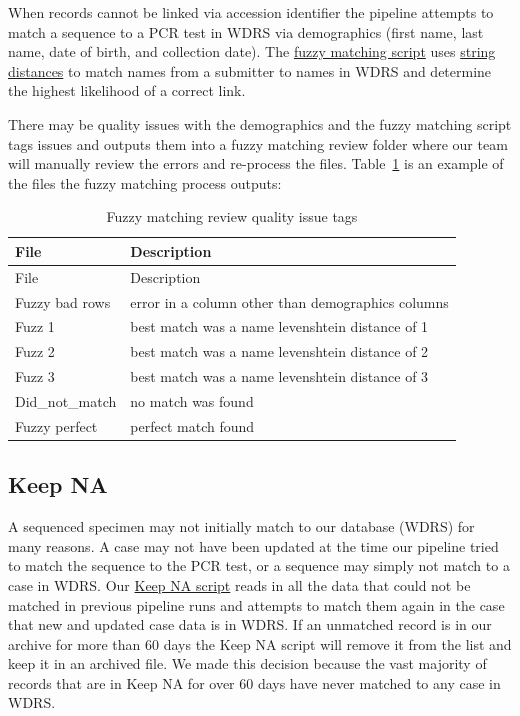 \documentclass[
  letterpaper,
  DIV=11,
  numbers=noendperiod]{scrartcl}
\begin{document}
When records cannot be linked via accession identifier the pipeline
attempts to match a sequence to a PCR test in WDRS via demographics
(first name, last name, date of birth, and collection date). The
\href{notebook/fuzzy.Rmd}{fuzzy matching script} uses
\href{https://github.com/markvanderloo/stringdist}{string distances} to
match names from a submitter to names in WDRS and determine the highest
likelihood of a correct link.

There may be quality issues with the demographics and the fuzzy matching
script tags issues and outputs them into a fuzzy matching review folder
where our team will manually review the errors and re-process the files.
Table~\ref{tbl-fuzzyreview} is an example of the files the fuzzy
matching process outputs:

\begin{longtable}[]{@{}ll@{}}
\caption{Fuzzy matching review quality issue
tags}\label{tbl-fuzzyreview}\tabularnewline
\toprule\noalign{}
File & Description \\
\midrule\noalign{}
\endfirsthead
\toprule\noalign{}
File & Description \\
\midrule\noalign{}
\endhead
\bottomrule\noalign{}
\endlastfoot
Fuzzy bad rows & error in a column other than demographics columns \\
Fuzz 1 & best match was a name levenshtein distance of 1 \\
Fuzz 2 & best match was a name levenshtein distance of 2 \\
Fuzz 3 & best match was a name levenshtein distance of 3 \\
Did\_not\_match & no match was found \\
Fuzzy perfect & perfect match found \\
\end{longtable}

\subsection{Keep NA}\label{sec-keepna}

A sequenced specimen may not initially match to our database (WDRS) for
many reasons. A case may not have been updated at the time our pipeline
tried to match the sequence to the PCR test, or a sequence may simply
not match to a case in WDRS. Our
\href{KEEP_NA_ROSTER_SECOND_IN_PROGRESS.Rmd}{Keep NA script} reads in
all the data that could not be matched in previous pipeline runs and
attempts to match them again in the case that new and updated case data
is in WDRS. If an unmatched record is in our archive for more than 60
days the Keep NA script will remove it from the list and keep it in an
archived file. We made this decision because the vast majority of
records that are in Keep NA for over 60 days have never matched to any
case in WDRS.
\end{document}
